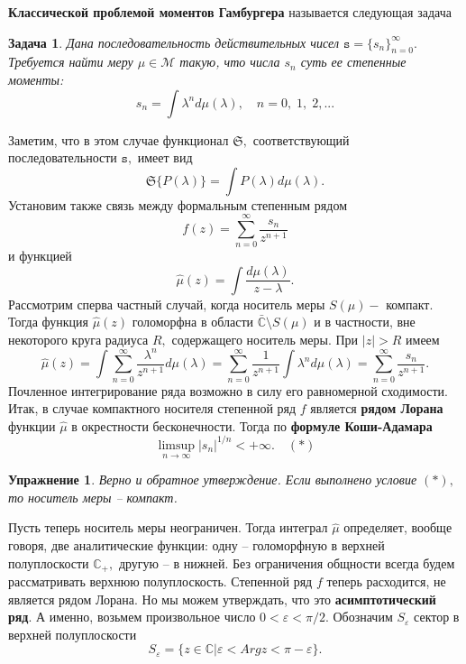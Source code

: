\documentclass[12 pt, a4 paper]{article}
\theoremstyle{plain}   \newtheorem{Pro}{Задача}
\newtheorem{Exe}{Упражнение}
\begin{document}
{\bfseries Классической проблемой моментов Гамбургера}
называется следующая задача
\begin{Pro}
Дана последовательность действительных чисел
$ \mathtt{s}=\{ s_n \} _{n=0}^{\infty} . $
Требуется найти меру
$ \mu \in \mathcal{M} $
такую, что числа
$ s_n $
суть ее степенные моменты:
$$
  s_n =\int \lambda ^n d \mu ( \lambda ) ,
  \quad n=0, \; 1, \; 2,...
$$
\end{Pro}
Заметим, что в этом случае функционал
$ \mathfrak{S} , $
соответствующий последовательности
$ \mathtt{s} , $
имеет вид
$$
  \mathfrak{S} \{ P(\lambda ) \} =
  \int P(\lambda ) d \mu ( \lambda ).
$$
Установим также связь между формальным степенным рядом
$$
  f(z)= \sum _{n=0}^{\infty}
  \frac{s_n}{z^{n+1}}
$$
и функцией
$$
  \hat \mu (z) = \int \frac{d \mu (\lambda )}{z-\lambda }.
$$
Рассмотрим сперва частный случай, когда носитель меры
$ S( \mu ) - $
компакт. Тогда функция
$ \hat \mu (z) $
голоморфна в области
$ \bar{\mathbb{C}} \setminus S( \mu ) $
и в частности, вне некоторого круга радиуса
$ R , $
содержащего носитель меры. При
$ |z|>R $
имеем
$$
  \hat \mu (z)=\int \sum _{n=0}^{\infty}
  \frac{\lambda ^n}{z^{n+1}}d \mu (\lambda ) =
  \sum _{n=0}^{\infty} \frac{1}{z^{n+1}}
  \int \lambda ^n d \mu ( \lambda )=
  \sum _{n=0}^{\infty} \frac{s_n}{z^{n+1}}.
$$
Почленное интегрирование ряда возможно в силу его равномерной
сходимости. Итак, в случае компактного носителя степенной ряд
$ f $
является
{\bfseries рядом Лорана}
функции
$ \hat \mu $
в окрестности бесконечности. Тогда по
{\bfseries формуле Коши-Адамара}
$$
  \limsup _{n \rightarrow \infty}
  |s_n |^{1/n} < + \infty . \quad ( \ast )
$$
\begin{Exe}
Верно и обратное утверждение. Если выполнено условие
$ ( \ast ) , $
то носитель меры -- компакт.
\end{Exe}
Пусть теперь носитель меры неограничен. Тогда интеграл
$ \hat \mu $
определяет, вообще говоря, две аналитические функции: одну --
голоморфную в верхней полуплоскости
$ \mathbb{C}_+ , $
другую -- в нижней. Без ограничения общности всегда
будем рассматривать верхнюю полуплоскость. Степенной ряд
$ f $
теперь расходится, не является рядом Лорана. Но мы можем
утверждать, что это
{\bfseries асимптотический ряд}.
А именно, возьмем произвольное число
$ 0< \varepsilon < \pi /2 . $
Обозначим
$ S_{\varepsilon} $
сектор в верхней полуплоскости
$$
  S_{\varepsilon}=
  \{z \in \mathbb{C} | \varepsilon < Arg z < \pi -
  \varepsilon \} .
$$
\end{document}
